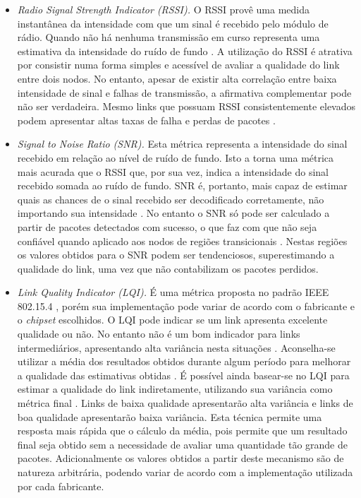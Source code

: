 \documentclass[
	12pt,				%
	openright,			%
	oneside,
	a4paper,			%
	english,			%
	french,				%
	spanish,			%
	brazil				%
	]{abntex2}
\begin{document}
\begin{itemize}
	\item \textit{Radio Signal Strength Indicator (RSSI).} O RSSI provê uma medida instantânea da intensidade com que um sinal é recebido pelo módulo de rádio. Quando não há nenhuma transmissão em curso representa uma estimativa da intensidade do ruído de fundo \cite{Baccour2012}. A utilização do RSSI é atrativa por consistir numa forma simples e acessível de avaliar a qualidade do link entre dois nodos. No entanto, apesar de existir alta correlação entre baixa intensidade de sinal e falhas de transmissão, a afirmativa complementar pode não ser verdadeira. Mesmo links que possuam RSSI consistentemente elevados podem apresentar altas taxas de falha e perdas de pacotes \cite{Srinivasan2006}.
	\item \textit{Signal to Noise Ratio (SNR).} Esta métrica representa a intensidade do sinal recebido em relação ao nível de ruído de fundo. Isto a torna uma métrica mais acurada que o RSSI que, por sua vez, indica a intensidade do sinal recebido somada ao ruído de fundo. SNR é, portanto, mais capaz de estimar quais as chances de o sinal recebido ser decodificado corretamente, não importando sua intensidade \cite{Srinivasan2010}. No entanto o SNR só pode ser calculado a partir de pacotes detectados com sucesso, o que faz com que não seja confiável quando aplicado aos nodos de regiões transicionais \cite{LaI2003}. Nestas regiões os valores obtidos para o SNR podem ser tendenciosos, superestimando a qualidade do link, uma vez que não contabilizam os pacotes perdidos.
	\item \textit{Link Quality Indicator (LQI).} É uma métrica proposta no padrão IEEE 802.15.4 \cite{IEEE2003}, porém sua implementação pode variar de acordo com o fabricante e o \textit{chipset} escolhidos. O LQI pode indicar se um link apresenta excelente qualidade ou não. No entanto não é um bom indicador para links intermediários, apresentando alta variância nesta situações \cite{Baccour2012}. Aconselha-se utilizar a média dos resultados obtidos durante algum período para melhorar a qualidade das estimativas obtidas \cite{Srinivasan2006}. É possível ainda basear-se no LQI para estimar a qualidade do link indiretamente, utilizando sua variância como métrica final \cite{Boano2009}. Links de baixa qualidade apresentarão alta variância e links de boa qualidade apresentarão baixa variância. Esta técnica permite uma resposta mais rápida que o cálculo da média, pois permite que um resultado final seja obtido sem a necessidade de avaliar uma quantidade tão grande de pacotes. Adicionalmente os valores obtidos a partir deste mecanismo são de natureza arbitrária, podendo variar de acordo com a implementação utilizada por cada fabricante.
\end{itemize}
	
\end{document}
